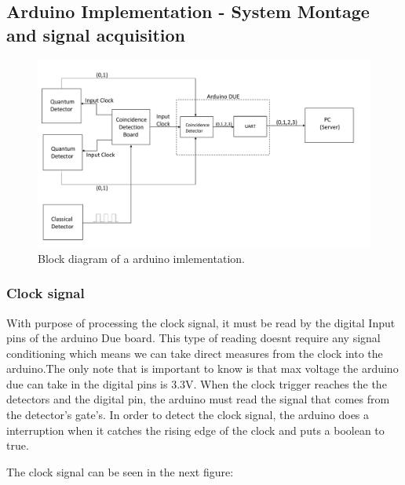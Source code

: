 \begin{refsection}
\begin{itemize}
	\end{itemize}
	
	
	\subsection{Arduino Implementation - System Montage and signal acquisition}
	
	\begin{figure}[H]
		\centering
		\includegraphics[width=1.1\linewidth]{./sdf/arduino_quantum_rx/figures/DiagramaGeralArduino.pdf}
		\caption{Block diagram of a arduino imlementation.}
		\label{fig:netxpto}
	\end{figure}
	
	
	\vspace{15px}
	\subsubsection{Clock signal}
	
	With purpose of processing the clock signal, it must be read by the digital Input pins of the arduino Due board. This type of reading doesnt require any signal conditioning which means we can take direct measures from the clock into the arduino.The only note that is important to know is that max voltage the arduino due can take in the digital pins is 3.3V. When the clock trigger reaches the the detectors and the digital pin, the arduino must read the signal that comes from the detector's gate's. In order to detect the clock signal, the arduino does a interruption when it catches the rising edge of the clock and puts a boolean to true.
	\vspace{15px}
	
   The clock signal can be seen in the next figure:
	

\end{refsection}
